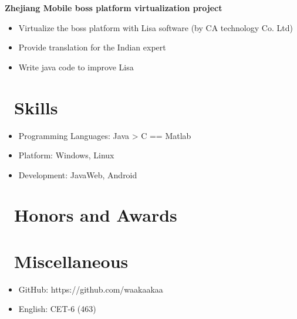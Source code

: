 \documentclass{resume}
\begin{document}
\textbf{Zhejiang Mobile boss platform virtualization project}
\begin{itemize}
  \item Virtualize the boss platform with Lisa software (by CA technology Co. Ltd)
  \item Provide translation for the Indian expert
  \item Write java code to improve Lisa
\end{itemize}

\section{\faCogs\ Skills}
\begin{itemize}[parsep=0.5ex]
  \item Programming Languages: Java > C == Matlab
  \item Platform: Windows, Linux
  \item Development: JavaWeb, Android
\end{itemize}

\section{\faHeartO\ Honors and Awards}
\vspace{1mm}
\vspace{1mm}
\vspace{1mm}

\section{\faInfo\ Miscellaneous}
\begin{itemize}[parsep=0.5ex]
  \item GitHub: https://github.com/waakaakaa
  \item English: CET-6 (463)
\end{itemize}
\end{document}
